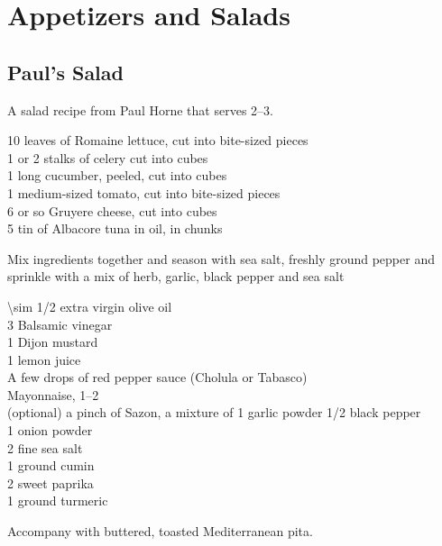 \chapter{Appetizers and Salads}

\section{Paul's Salad
}

\begin{open}
    A salad recipe from Paul Horne that serves \numrange{2}{3}.
\end{open}
\begin{ingredients}
    10 leaves of Romaine lettuce, cut into bite-sized pieces\\
    1 or 2 stalks of celery cut into cubes\\
    1 long cucumber, peeled, cut into cubes\\
    1 medium-sized tomato, cut into bite-sized pieces\\
    \SI{6}{\ounce} or so Gruyere cheese, cut into cubes\\
    \SI{5}{\ounce} tin of Albacore tuna in oil, in chunks
\end{ingredients}
Mix ingredients together and season with sea salt, freshly ground pepper and
sprinkle with a mix of herb, garlic, black pepper and sea salt


\begin{ingredients}
    \SI{\sim 1/2}{\cup} extra virgin olive oil\\
    \SI{3}{\tblspoon} Balsamic vinegar\\
    \SI{1}{\tblspoon} Dijon mustard\\
    \SI{1}{\tblspoon} lemon juice\\
    A few drops of red pepper sauce (Cholula or Tabasco)\\
    Mayonnaise, \SIrange[range-phrase={ or }]{1}{2}{\tblspoon}\\
    (optional) a pinch of Sazon, a mixture of \SI{1}{\tblspoon} garlic powder
    \SI{1/2}{\teaspoon} black pepper\\
    \SI{1}{\tblspoon} onion powder\\
    \SI{2}{\tblspoon} fine sea salt\\
    \SI{1}{\tblspoon} ground cumin\\
    \SI{2}{\tblspoon} sweet paprika\\
    \SI{1}{\tblspoon} ground turmeric
\end{ingredients}
Accompany with buttered, toasted Mediterranean pita.

